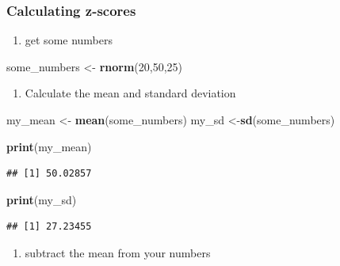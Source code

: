 \documentclass[]{book}
\newenvironment{Shaded}{\begin{snugshade}}{\end{snugshade}}
\newcommand{\KeywordTok}[1]{\textcolor[rgb]{0.13,0.29,0.53}{\textbf{{#1}}}}
\newcommand{\DecValTok}[1]{\textcolor[rgb]{0.00,0.00,0.81}{{#1}}}
\newcommand{\StringTok}[1]{\textcolor[rgb]{0.31,0.60,0.02}{{#1}}}
\newcommand{\NormalTok}[1]{{#1}}
\providecommand{\tightlist}{%
  \setlength{\itemsep}{0pt}\setlength{\parskip}{0pt}}
\theoremstyle{definition}
\theoremstyle{definition}
\theoremstyle{definition}
\theoremstyle{remark}
\begin{document}
\subsubsection{Calculating z-scores}\label{calculating-z-scores}

\begin{enumerate}
\def\labelenumi{\arabic{enumi}.}
\tightlist
\item
  get some numbers
\end{enumerate}

\begin{Shaded}
\begin{Highlighting}[]
\NormalTok{some_numbers <-}\StringTok{ }\KeywordTok{rnorm}\NormalTok{(}\DecValTok{20}\NormalTok{,}\DecValTok{50}\NormalTok{,}\DecValTok{25}\NormalTok{)}
\end{Highlighting}
\end{Shaded}

\begin{enumerate}
\def\labelenumi{\arabic{enumi}.}
\setcounter{enumi}{1}
\tightlist
\item
  Calculate the mean and standard deviation
\end{enumerate}

\begin{Shaded}
\begin{Highlighting}[]
\NormalTok{my_mean <-}\StringTok{ }\KeywordTok{mean}\NormalTok{(some_numbers)}
\NormalTok{my_sd <-}\KeywordTok{sd}\NormalTok{(some_numbers)}

\KeywordTok{print}\NormalTok{(my_mean)}
\end{Highlighting}
\end{Shaded}

\begin{verbatim}
## [1] 50.02857
\end{verbatim}

\begin{Shaded}
\begin{Highlighting}[]
\KeywordTok{print}\NormalTok{(my_sd)}
\end{Highlighting}
\end{Shaded}

\begin{verbatim}
## [1] 27.23455
\end{verbatim}

\begin{enumerate}
\def\labelenumi{\arabic{enumi}.}
\setcounter{enumi}{2}
\tightlist
\item
  subtract the mean from your numbers
\end{enumerate}
\end{document}
